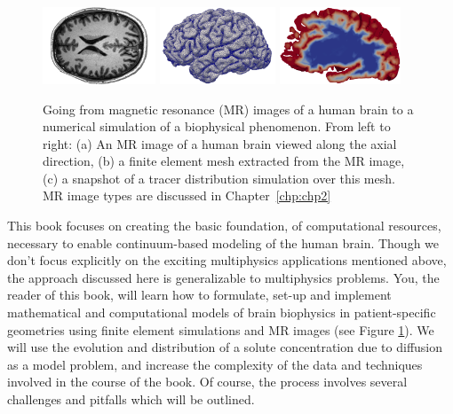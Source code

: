 \begin{figure}
  \begin{center}
  \includegraphics[height=2.3cm]{./graphics/chp1/T1-image-rot-white}
  \includegraphics[height=2.3cm]{./graphics/chp1/ernie-volume-64}
  \includegraphics[height=2.3cm]{./graphics/chp1/soltn-t30-crop}
  \hfill
  \end{center}
  \caption{Going from magnetic resonance (MR) images of a human brain
    to a numerical simulation of a biophysical phenomenon. From left
    to right: (a) An MR image of a human brain viewed along the axial
    direction, (b) a finite element mesh extracted from the MR image,
    (c) a snapshot of a tracer distribution simulation over this
    mesh. MR image types are discussed in Chapter~\ref{chp:chp2}}
  \label{fig:chp1:pipeline}
\end{figure}

This book focuses on creating the basic foundation, of computational resources, 
necessary to enable continuum-based modeling of the human brain.  Though we 
don't focus explicitly on the exciting multiphysics applications mentioned 
above, the approach discussed here is generalizable to multiphysics problems.  
You, the reader of this book, will learn how to formulate, set-up and implement 
mathematical and computational models of brain biophysics in patient-specific 
geometries using finite element simulations and MR images (see Figure
\ref{fig:chp1:pipeline}). We will use the evolution and distribution
of a solute concentration due to diffusion as a model problem, and
increase the complexity of the data and techniques involved in the
course of the book. Of course, the process involves several challenges
and pitfalls which will be outlined.

